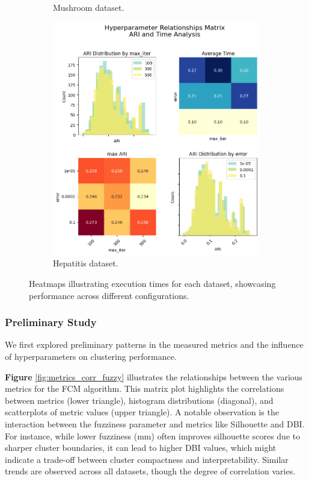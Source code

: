 \begin{figure}[H]
\begin{subfigure}{0.32\textwidth}
        \caption{Mushroom dataset.}
    \end{subfigure}
    \begin{subfigure}{0.32\textwidth}
        \centering
        \includegraphics[width=\linewidth]{figures/FuzzyCMeans/hepatitis_error_iter_pairplot}
        \caption{Hepatitis dataset.}
    \end{subfigure}
    \caption{Heatmaps illustrating execution times for each dataset, showcasing performance across different configurations.}
    \label{fig:error-iter-fuzzy}
\end{figure}


\subsubsection{Preliminary Study}

We first explored preliminary patterns in the measured metrics and the influence of hyperparameters on clustering performance.


\textbf{Figure} \ref{fig:metrics_corr_fuzzy} illustrates the relationships between the various metrics for the FCM algorithm. This matrix plot highlights the correlations between metrics (lower triangle), histogram distributions (diagonal), and scatterplots of metric values (upper triangle). A notable observation is the interaction between the fuzziness parameter and metrics like Silhouette and DBI. For instance, while lower fuzziness (mm) often improves silhouette scores due to sharper cluster boundaries, it can lead to higher DBI values, which might indicate a trade-off between cluster compactness and interpretability. Similar trends are observed across all datasets, though the degree of correlation varies.


